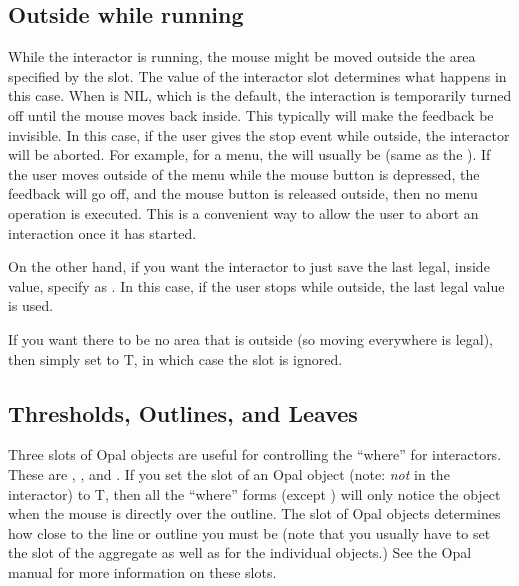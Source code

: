 \subsection{Outside while running}
\label{Outside}
While the interactor is running, the mouse might be moved outside the area
specified by the  slot.  The value of the interactor
slot  determines what happens in this case.  When
 is NIL, which is the default, the interaction is
temporarily turned off until the mouse moves back inside.
This typically will make the feedback be invisible.  In this case, if the
user gives the stop event while outside, the interactor will be aborted.
For example, for a menu, the  will usually be
 (same as the ).  If the user
moves outside of the menu while the mouse button is depressed, the feedback
will go off, and the mouse button is released outside, then no menu
operation is executed.
This is a convenient way to allow the user to abort an interaction once it
has started.

On the other hand, if you want the interactor to just save the last legal,
inside value, specify  as .  In this case, if the user
stops while outside, the last legal value is used.

If you want there to be no area that is outside (so moving everywhere is
legal), then simply set  to T, in which case the
 slot is ignored.

\subsection{Thresholds, Outlines, and Leaves}
\label{hitthreshold}
Three slots of Opal objects are useful for controlling the ``where'' for
interactors.  These are , ,
and .  If you set the
 slot of an Opal object (note: {\it not} in the
interactor) to T, then all the ``where'' forms (except ) will
only notice the object when the mouse is directly over the outline.  The
 slot of Opal objects determines how close to the
line or outline you must be (note that you usually have to set the
 slot of the aggregate as well as for the
individual objects.)  See the Opal manual for more information on these slots.

